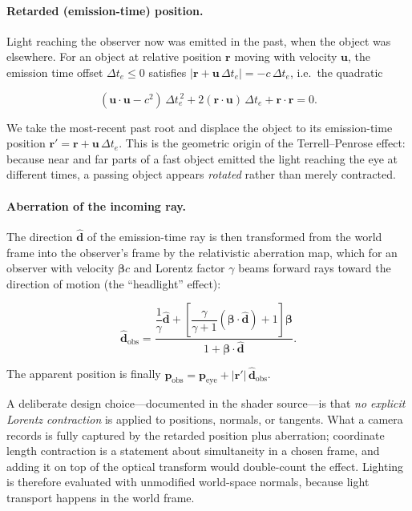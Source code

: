 \documentclass[aip,amsmath,amssymb,reprint,nofootinbib]{revtex4-2}
\begin{document}
\paragraph{Retarded (emission-time) position.}
Light reaching the observer now was emitted in the past, when the object was
elsewhere. For an object at relative position $\bm{r}$ moving with velocity
$\bm{u}$, the emission time offset $\Delta t_e \le 0$ satisfies
$|\bm{r} + \bm{u}\,\Delta t_e| = -c\,\Delta t_e$, i.e.\ the quadratic

\begin{equation}
(\bm{u}\!\cdot\!\bm{u} - c^2)\,\Delta t_e^{\,2}
+ 2(\bm{r}\!\cdot\!\bm{u})\,\Delta t_e
+ \bm{r}\!\cdot\!\bm{r} = 0 .
\label{eq:retarded}
\end{equation}

We take the most-recent past root and displace the object to its
emission-time position $\bm{r}' = \bm{r} + \bm{u}\,\Delta t_e$. This is the
geometric origin of the Terrell--Penrose effect: because near and far parts of a
fast object emitted the light reaching the eye at different times, a passing
object appears \emph{rotated} rather than merely contracted.\cite{Terrell1959,Penrose1959}

\paragraph{Aberration of the incoming ray.}
The direction $\hat{\bm{d}}$ of the emission-time ray is then transformed from
the world frame into the observer's frame by the relativistic aberration map,
which for an observer with velocity $\bm{\beta}c$ and Lorentz factor $\gamma$
beams forward rays toward the direction of motion (the ``headlight'' effect):

\begin{equation}
\hat{\bm{d}}_{\mathrm{obs}}
= \frac{\dfrac{1}{\gamma}\hat{\bm{d}}
  + \left[\dfrac{\gamma}{\gamma+1}(\bm{\beta}\!\cdot\!\hat{\bm{d}}) + 1\right]\bm{\beta}}
  {1 + \bm{\beta}\!\cdot\!\hat{\bm{d}}} .
\label{eq:aberration}
\end{equation}

The apparent position is finally $\bm{p}_{\mathrm{obs}} =
\bm{p}_{\mathrm{eye}} + |\bm{r}'|\,\hat{\bm{d}}_{\mathrm{obs}}$.

A deliberate design choice---documented in the shader source---is that
\emph{no explicit Lorentz contraction} is applied to positions, normals, or
tangents. What a camera records is fully captured by the retarded position plus
aberration; coordinate length contraction is a statement about simultaneity in a
chosen frame, and adding it on top of the optical transform would double-count
the effect.\cite{Weisskopf1960} Lighting is therefore evaluated with unmodified
world-space normals, because light transport happens in the world frame.
\end{document}
